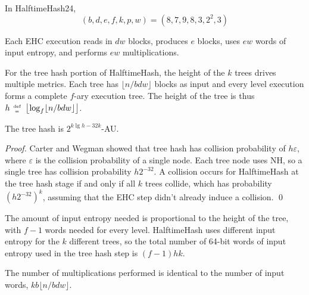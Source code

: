 \documentclass{llncs}
\newcommand{\defeq}{\;\genfrac{}{}{0pt}{2}{\text{def}}{=}\;}
\begin{document}
In HalftimeHash24, \[(b, d, e, f, k, p, w) = (8, 7, 9, 8, 3, 2^2, 3)\]

Each EHC execution reads in $d w$ blocks, produces $e$ blocks, uses $e w$ words of input entropy, and performs $e w$ multiplications.

For the tree hash portion of HalftimeHash, the height of the $k$ trees drives multiple metrics.
Each tree has $\lfloor n / b d w \rfloor$ blocks as input and every level execution forms a complete $f$-ary execution tree.
The height of the tree is thus $h \defeq \left\lfloor \log_f \lfloor n / b d w \rfloor \right\rfloor$.

\begin{lemma}
The tree hash is $2^{ k\lg h - 32k}$-AU.
\end{lemma}
\begin{proof}
  Carter and Wegman showed that tree hash has collision probability of $h \varepsilon$, where $\varepsilon$ is the collision probability of a single node.
  Each tree node uses NH, so a single tree has collision probability $h 2^{-32}$.
  A collision occurs for HalftimeHash at the tree hash stage if and only if all $k$ trees collide, which has probability $\left(h 2^{-32}\right)^k$, assuming that the EHC step didn't already induce a collision. \qed
\end{proof}

The amount of input entropy needed is proportional to the height of the tree, with $f - 1$ words needed for every level.
HalftimeHash uses different input entropy for the $k$ different trees, so the total number of 64-bit words of input entropy used in the tree hash step is $(f - 1) h k$.

The number of multiplications performed is identical to the number of input words, $k b \lfloor n / b d w \rfloor$.

\end{document}
